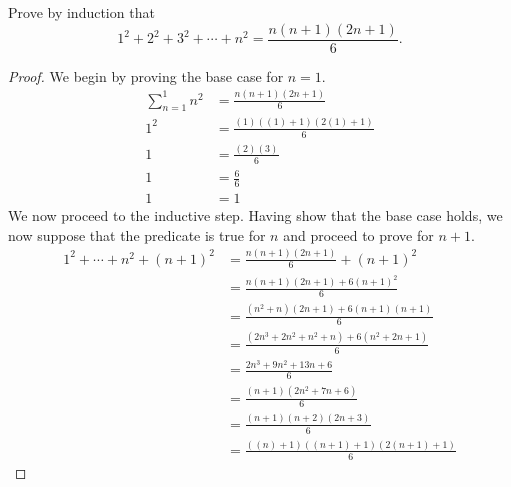 \begin{exercise}
	Prove by induction that
	\begin{equation*}
	1^2 + 2^2 + 3^2 + \cdots + n^2 = \frac{n \left( n + 1 \right) \left( 2n + 1 \right)}{6}.
	\end{equation*}
\end{exercise}
\begin{proof}
	We begin by proving the base case for $n = 1$.
	\begin{align*}
	\sum_{n = 1}^{1} n^2 &= \frac{ n \left( n + 1 \right) \left( 2n + 1 \right)}{6} \\
	1^2 &= \frac{ \left( 1 \right) \left( \left( 1 \right) + 1 \right) \left( 2 \left( 1 \right) + 1 \right) }{6} \\
	1 &= \frac{ \left( 2 \right) \left( 3 \right) }{6} \\
	1 &= \frac{6}{6} \\
	1 &= 1
	\end{align*}
	We now proceed to the inductive step. Having show that the base case holds, we now suppose that the predicate is true for $n$ and proceed to prove for $n + 1$.
	\begin{align*}
	1^2 + \cdots + n^2 + \left( n + 1 \right)^2 &= \frac{ n \left( n + 1 \right) \left( 2n + 1 \right) }{6} + \left( n + 1 \right)^2 \\
	&= \frac{n \left( n + 1 \right) \left( 2n + 1 \right) + 6 \left( n + 1 \right)^2 }{6} \\
	&= \frac{ \left( n^2 + n \right) \left( 2n + 1 \right) + 6 \left( n + 1 \right) \left( n + 1 \right) }{6} \\
	&= \frac{ \left( 2n^3 + 2n^2 + n^2 + n \right) + 6 \left( n^2 + 2n + 1 \right) }{6} \\
	&= \frac{ 2n^3 + 9n^2 + 13n + 6 }{6} \\
	&= \frac{ \left( n + 1 \right) \left( 2n^2 + 7n + 6 \right) }{6} \\
	&= \frac{ \left( n + 1 \right) \left( n + 2 \right) \left( 2n + 3 \right) }{6} \\
	&= \frac{ \left( \left( n \right) + 1 \right) \left( \left( n + 1 \right) + 1 \right) \left( 2 \left( n + 1 \right) + 1 \right) }{6}
	\end{align*}
\end{proof}
